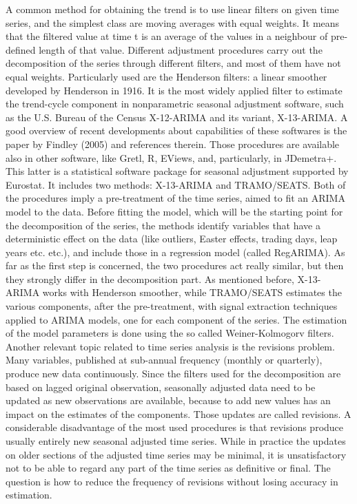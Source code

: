 \documentclass{article}
\begin{document}
A common method for obtaining the trend is to use linear filters on given time series, and the simplest class are moving averages with equal weights. It means that the filtered value at time t is an average of the values in a neighbour of pre-defined length of that value. Different adjustment procedures carry out the decomposition of the series through different filters, and most of them have not equal weights. Particularly used are the Henderson filters: a linear smoother developed by Henderson in 1916. It is the most widely applied filter to estimate the trend-cycle component in nonparametric seasonal adjustment software, such as the U.S. Bureau of the Census X-12-ARIMA and its variant, X-13-ARIMA. A good overview of recent developments about capabilities of these softwares is the paper by Findley (2005) and references therein. Those procedures are available also in other software, like Gretl, R, EViews, and, particularly, in JDemetra+. \\
This latter is  a statistical software package for seasonal adjustment supported by Eurostat. It includes two methods: X-13-ARIMA and TRAMO/SEATS. Both of the procedures imply a pre-treatment of the time series, aimed to fit an ARIMA model to the data. Before fitting the model, which will be the starting point for the decomposition of the series, the methods identify variables that have a deterministic effect on the data (like outliers, Easter effects, trading days, leap years etc. etc.), and include those in a regression model  (called RegARIMA). As far as the first step is concerned, the two procedures act really similar, but then they strongly differ in the decomposition part. As mentioned before, X-13-ARIMA works with Henderson smoother, while TRAMO/SEATS estimates the various components, after the pre-treatment, with signal extraction techniques applied to ARIMA models, one for each component of the series. The estimation of the model parameters is done using the so called Weiner-Kolmogorv filters.\\
Another relevant topic related to time series analysis is the revisions problem. Many variables, published at sub-annual frequency (monthly or quarterly), produce new data  continuously. Since the filters used for the decomposition are based on lagged original observation, seasonally adjusted data need to be updated as new observations are available, because to add new values has an impact on the estimates of the components. Those updates are called revisions. A considerable disadvantage of the most used procedures is that revisions produce usually entirely new seasonal adjusted time series. While in practice the updates on older sections of the adjusted time series may be minimal, it is unsatisfactory not to be able to regard any part of the time series as definitive or final. The question is how to reduce the frequency of revisions without losing accuracy in estimation. \\
\end{document}
